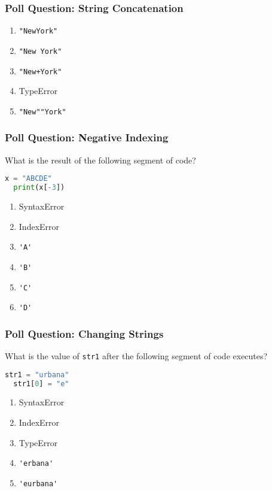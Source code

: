 \documentclass{beamer}
\begin{document}
%
%
\begin{frame}[fragile]
  \frametitle{Poll Question: String Concatenation}
  \begin{enumerate}[A] 
    \item \lstinline{"NewYork"}  %
    \item \lstinline{"New York"} 
    \item \lstinline{"New+York"} 
    \item TypeError
    \item \lstinline{"New""York"} 
  \end{enumerate}
\end{frame}

%
%
\begin{frame}[fragile]
  \frametitle{Poll Question: Negative Indexing}
  What is the result of the following segment of code?
  \begin{lstlisting}[language=Python] 
  x = "ABCDE"
  print(x[-3])
  \end{lstlisting}
  \vfill
  \begin{enumerate}[A] 
    \item SyntaxError
    \item IndexError
    \item \lstinline{'A'}
    \item \lstinline{'B'}
    \item \lstinline{'C'} %
    \item \lstinline{'D'}
  \end{enumerate}
\end{frame}

%
%
\begin{frame}[fragile]
  \frametitle{Poll Question: Changing Strings}
  What is the value of \lstinline|str1| after the following segment of code executes?
  \begin{lstlisting}[language=Python] 
  str1 = "urbana"
  str1[0] = "e"
  \end{lstlisting}
  \vfill
  \begin{enumerate}[A] 
    \item SyntaxError
    \item IndexError
    \item TypeError %
    \item \lstinline{'erbana'}
    \item \lstinline{'eurbana'}
  \end{enumerate}
\end{frame}
\end{document}
